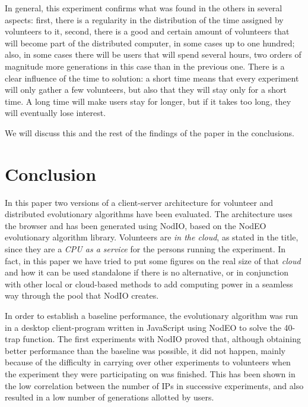 \documentclass[journal,onecolumn]{IEEEtran}
\begin{document}
In general, this experiment confirms what was found in the others in
several aspects: first, there is a regularity in the distribution of the
time assigned by volunteers to it, second, there is a good and certain
amount of volunteers that will become part of the distributed
computer, in some cases up to one hundred; also, in some cases there
will be users that will spend several hours, two orders of magnitude
more generations in this case than in the previous one. There is a
clear influence of the time to solution: a short time means that every
experiment will only gather a few volunteers, but also that they will
stay only for a short time. A long time will make users stay for
longer, but if it takes too long, they will eventually lose interest. 

We will discuss this and the rest of the findings of the paper in the
conclusions. 

\section{Conclusion}
\label{sec:conclusion}

In this paper two versions of a client-server architecture for volunteer and distributed
evolutionary algorithms have been evaluated. The architecture uses the browser and has been generated using {\sf
  NodIO}, based on the {\sf NodEO} evolutionary algorithm library. Volunteers are {\em in the cloud}, as stated in the title,
since they are a {\em CPU as a service} for the persons running the
experiment. In fact, in this paper we have tried to put some figures
on the real size of that {\em cloud} and how it can be used standalone
if there is no alternative, or in conjunction with other local or
cloud-based methods to add computing power in a seamless way through
the pool that {\sf NodIO} creates. 

In order to establish a baseline performance, the evolutionary
algorithm was run in a desktop client-program written in JavaScript
using NodEO to solve the 40-trap function. The first experiments with
{\sf NodIO} proved that, although obtaining better performance than the
baseline was possible, it did not happen, mainly because of the
difficulty in carrying over other experiments to volunteers when the
experiment they were participating on was finished. This has been shown in the low
correlation between the number of IPs in successive experiments, and also resulted in a low number of generations allotted by users. 
\end{document}
